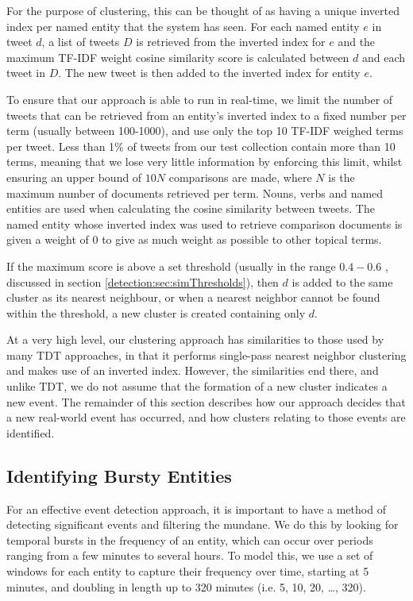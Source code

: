 For the purpose of clustering, this can be thought of as having a unique inverted index per named entity that the system has seen.
For each named entity $e$ in tweet $d$, a list of tweets $D$ is retrieved from the inverted index for $e$ and the maximum TF-IDF weight cosine similarity score is calculated between $d$ and each tweet in $D$.
The new tweet is then added to the inverted index for entity $e$.

To ensure that our approach is able to run in real-time, we limit the number of tweets that can be retrieved from an entity's inverted index to a fixed number per term (usually between 100-1000), and use only the top 10 TF-IDF weighed terms per tweet.
Less than 1\% of tweets from our test collection contain more than 10 terms, meaning that we lose very little information by enforcing this limit, whilst ensuring an upper bound of \(10N\) comparisons are made, where \(N\) is the maximum number of documents retrieved per term.
Nouns, verbs and named entities are used when calculating the cosine similarity between tweets.
The named entity whose inverted index was used to retrieve comparison documents is given a weight of 0 to give as much weight as possible to other topical terms.

If the maximum score is above a set threshold (usually in the range \(0.4-0.6\) \citep{Petrovic10}, discussed in section \ref{detection:sec:simThresholds}), then $d$ is added to the same cluster as its nearest neighbour, or when a nearest neighbor cannot be found within the threshold, a new cluster is created containing only $d$.

At a very high level, our clustering approach has similarities to those used by many TDT approaches, in that it performs single-pass nearest neighbor clustering and makes use of an inverted index.
However, the similarities end there, and unlike TDT, we do not assume that the formation of a new cluster indicates a new event.
The remainder of this section describes how our approach decides that a new real-world event has occurred, and how clusters relating to those events are identified.

\subsection{Identifying Bursty Entities}
For an effective event detection approach, it is important to have a method of detecting significant events and filtering the mundane.
We do this by looking for temporal bursts in the frequency of an entity, which can occur over periods ranging from a few minutes to several hours.
To model this, we use a set of windows for each entity to capture their frequency over time, starting at 5 minutes, and doubling in length up to 320 minutes (i.e. 5, 10, 20, \ldots, 320).

